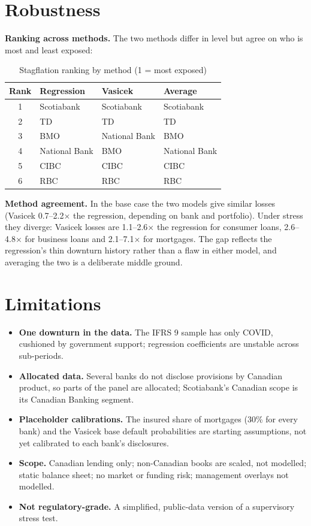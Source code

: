 \documentclass[11pt,letterpaper]{article}
\begin{document}
\section{Robustness}
\textbf{Ranking across methods.} The two methods differ in level but agree on who is most and least exposed:

\begin{table}[H]\centering\small
\caption{Stagflation ranking by method (1 = most exposed)}
\begin{tabular}{@{}clll@{}}\toprule
Rank & Regression & Vasicek & Average \\ \midrule
1 & Scotiabank & Scotiabank & Scotiabank \\
2 & TD & TD & TD \\
3 & BMO & National Bank & BMO \\
4 & National Bank & BMO & National Bank \\
5 & CIBC & CIBC & CIBC \\
6 & RBC & RBC & RBC \\ \bottomrule
\end{tabular}
\end{table}

\textbf{Method agreement.} In the base case the two models give similar losses (Vasicek 0.7--2.2$\times$ the regression, depending on bank and portfolio). Under stress they diverge: Vasicek losses are 1.1--2.6$\times$ the regression for consumer loans, 2.6--4.8$\times$ for business loans and 2.1--7.1$\times$ for mortgages. The gap reflects the regression's thin downturn history rather than a flaw in either model, and averaging the two is a deliberate middle ground.

\section{Limitations}
\begin{itemize}[leftmargin=12pt]
  \item \textbf{One downturn in the data.} The IFRS 9 sample has only COVID, cushioned by government support; regression coefficients are unstable across sub-periods.
  \item \textbf{Allocated data.} Several banks do not disclose provisions by Canadian product, so parts of the panel are allocated; Scotiabank's Canadian scope is its Canadian Banking segment.
  \item \textbf{Placeholder calibrations.} The insured share of mortgages (30\% for every bank) and the Vasicek base default probabilities are starting assumptions, not yet calibrated to each bank's disclosures.
  \item \textbf{Scope.} Canadian lending only; non-Canadian books are scaled, not modelled; static balance sheet; no market or funding risk; management overlays not modelled.
  \item \textbf{Not regulatory-grade.} A simplified, public-data version of a supervisory stress test.
\end{itemize}
\end{document}
